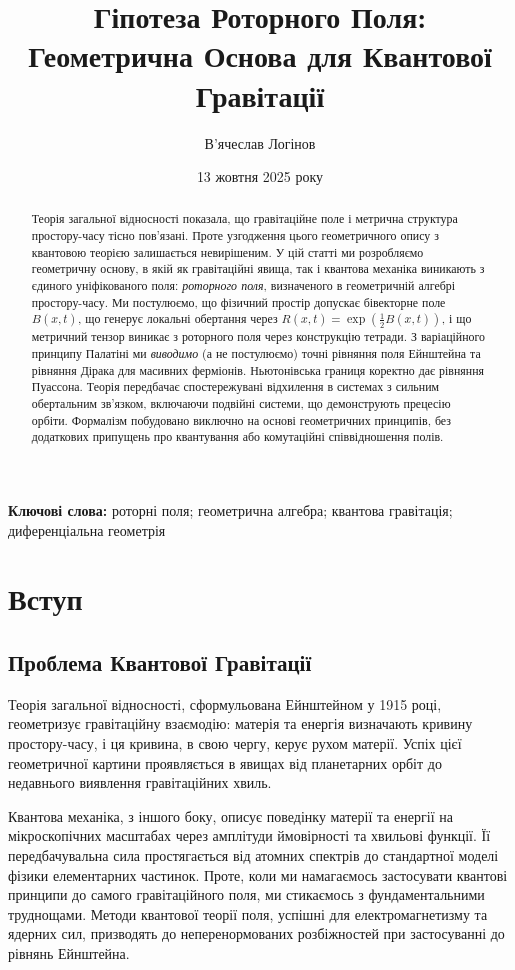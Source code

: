 \documentclass[11pt,a4paper]{article}
\title{Гіпотеза Роторного Поля: Геометрична Основа для Квантової Гравітації}
\author[1]{В'ячеслав Логінов}
\affil[1]{Київ, Україна\\ \texttt{barthez.slavik@gmail.com}}
\date{13 жовтня 2025 року}
\numberwithin{equation}{section}
\theoremstyle{plain}
\theoremstyle{definition}
\theoremstyle{remark}
\newcommand{\keywords}{\textbf{Ключові слова:} роторні поля; геометрична алгебра; квантова гравітація; диференціальна геометрія}
\begin{document}
\maketitle

\begin{abstract}
Теорія загальної відносності показала, що гравітаційне поле і метрична структура простору-часу тісно пов'язані. Проте узгодження цього геометричного опису з квантовою теорією залишається невирішеним. У цій статті ми розробляємо геометричну основу, в якій як гравітаційні явища, так і квантова механіка виникають з єдиного уніфікованого поля: \emph{роторного поля}, визначеного в геометричній алгебрі простору-часу. Ми постулюємо, що фізичний простір допускає бівекторне поле $B(x,t)$, що генерує локальні обертання через $R(x,t)=\exp(\frac{1}{2}B(x,t))$, і що метричний тензор виникає з роторного поля через конструкцію тетради. З варіаційного принципу Палатіні ми \emph{виводимо} (а не постулюємо) точні рівняння поля Ейнштейна та рівняння Дірака для масивних ферміонів. Ньютонівська границя коректно дає рівняння Пуассона. Теорія передбачає спостережувані відхилення в системах з сильним обертальним зв'язком, включаючи подвійні системи, що демонструють прецесію орбіти. Формалізм побудовано виключно на основі геометричних принципів, без додаткових припущень про квантування або комутаційні співвідношення полів.
\end{abstract}

\keywords

\section{Вступ}
\label{sec:intro}

\subsection{Проблема Квантової Гравітації}

Теорія загальної відносності, сформульована Ейнштейном у 1915 році, геометризує гравітаційну взаємодію: матерія та енергія визначають кривину простору-часу, і ця кривина, в свою чергу, керує рухом матерії. Успіх цієї геометричної картини проявляється в явищах від планетарних орбіт до недавнього виявлення гравітаційних хвиль.

Квантова механіка, з іншого боку, описує поведінку матерії та енергії на мікроскопічних масштабах через амплітуди ймовірності та хвильові функції. Її передбачувальна сила простягається від атомних спектрів до стандартної моделі фізики елементарних частинок. Проте, коли ми намагаємось застосувати квантові принципи до самого гравітаційного поля, ми стикаємось з фундаментальними труднощами. Методи квантової теорії поля, успішні для електромагнетизму та ядерних сил, призводять до неперенормованих розбіжностей при застосуванні до рівнянь Ейнштейна.
\end{document}
